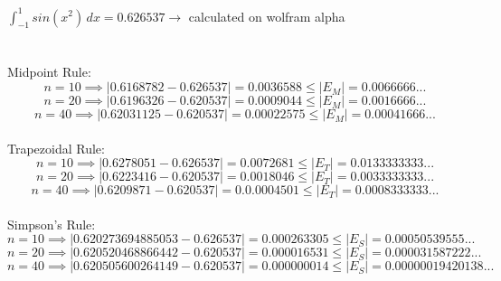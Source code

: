 \documentclass{article}
\begin{document}
    $ \int_{-1}^{1} sin(x^2) \, dx = 0.626537 \to $  calculated on wolfram alpha \\\\\\
    
    Midpoint Rule: 
    $$ n = 10 \implies |0.6168782 - 0.626537| = 0.0036588 \leq |E_M| = 0.0066666... $$
    $$ n = 20 \implies |0.6196326 - 0.620537| = 0.0009044 \leq |E_M| = 0.0016666... $$
    $$ n = 40 \implies |0.62031125 - 0.620537| = 0.00022575 \leq |E_M| = 0.00041666...$$ \\

    Trapezoidal Rule: \\
    $$ n = 10 \implies |0.6278051 - 0.626537| = 0.0072681 \leq |E_T| = 0.0133333333... $$
    $$ n = 20 \implies |0.6223416 - 0.620537| = 0.0018046 \leq |E_T| = 0.0033333333... $$
    $$ n = 40 \implies |0.6209871 - 0.620537| = 0.0.0004501 \leq |E_T| = 0.0008333333...$$ \\

    Simpson's Rule: \\
    $$ n = 10 \implies |0.620273694885053 - 0.626537| = 0.000263305 \leq |E_S| = 0.00050539555... $$
    $$ n = 20 \implies |0.620520468866442 - 0.620537| = 0.000016531 \leq |E_S| = 0.000031587222...$$
    $$ n = 40 \implies |0.620505600264149 - 0.620537| = 0.000000014 \leq |E_S| = 0.00000019420138...$$
\end{document}
